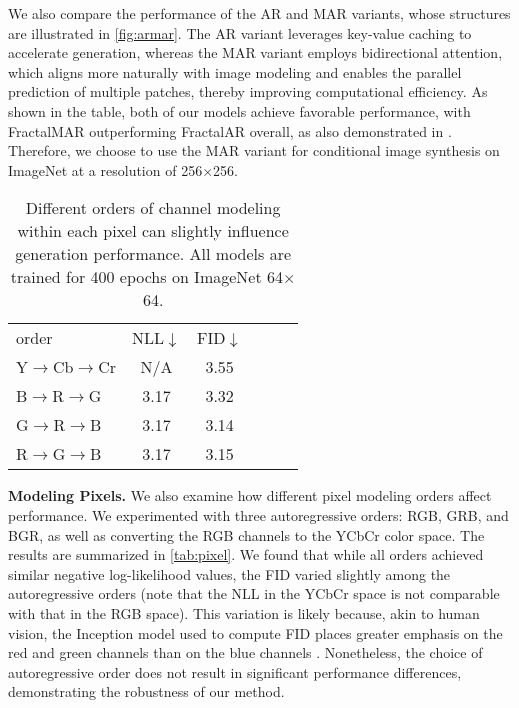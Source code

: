 \documentclass{article}
\newcommand{\tablestyle}[2]{\setlength{\tabcolsep}{#1}\renewcommand{\arraystretch}{#2}\centering\footnotesize}
\renewcommand{\paragraph}[1]{\vspace{0.0em}\noindent\textbf{#1}}
\begin{document}
We also compare the performance of the AR and MAR variants, whose structures are illustrated in \autoref{fig:armar}. The AR variant leverages key-value caching to accelerate generation, whereas the MAR variant employs bidirectional attention, which aligns more naturally with image modeling and enables the parallel prediction of multiple patches, thereby improving computational efficiency. As shown in the table, both of our models achieve favorable performance, with FractalMAR outperforming FractalAR overall, as also demonstrated in \cite{li2024autoregressive}. Therefore, we choose to use the MAR variant for conditional image synthesis on ImageNet at a resolution of 256$\times$256.

\begin{table}[h]
\begin{center}{
\vspace{-5pt}
\caption{
Different orders of channel modeling within each pixel can slightly influence generation performance. All models are trained for 400 epochs on ImageNet 64$\times$64.}
\label{tab:pixel}
\tablestyle{2pt}{1.2}
\begin{tabular}{l | c c c c c}
order & NLL$\downarrow$ & FID$\downarrow$ \\
\shline
Y$\rightarrow$Cb$\rightarrow$Cr  &  N/A & 3.55 \\
B$\rightarrow$R$\rightarrow$G  & 3.17 & 3.32 \\
G$\rightarrow$R$\rightarrow$B  & 3.17 & 3.14 \\
R$\rightarrow$G$\rightarrow$B  & 3.17 & 3.15 \\
\end{tabular}
}
\end{center}
\end{table}


\paragraph{Modeling Pixels.} We also examine how different pixel modeling orders affect performance. We experimented with three autoregressive orders: RGB, GRB, and BGR, as well as converting the RGB channels to the YCbCr color space. The results are summarized in \autoref{tab:pixel}. We found that while all orders achieved similar negative log-likelihood values, the FID varied slightly among the autoregressive orders (note that the NLL in the YCbCr space is not comparable with that in the RGB space). This variation is likely because, akin to human vision, the Inception model used to compute FID places greater emphasis on the red and green channels than on the blue channels \citep{mustafi2009structure}. Nonetheless, the choice of autoregressive order does not result in significant performance differences, demonstrating the robustness of our method.
\end{document}
